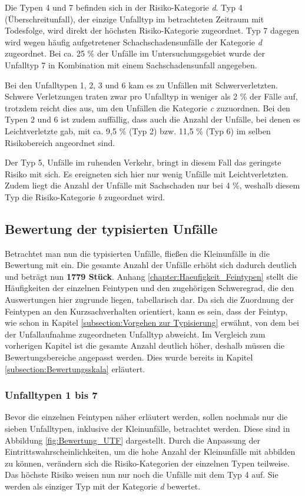 Die Typen 4 und 7 befinden sich in der Risiko-Kategorie \textit{d}. Typ 4 (Überschreitunfall), der einzige Unfalltyp im betrachteten Zeitraum mit Todesfolge, wird direkt der höchsten Risiko-Kategorie zugeordnet. Typ 7 dagegen wird wegen häufig aufgetretener Schachschadensunfälle der Kategorie \textit{d} zugeordnet. Bei ca. 25 \% der Unfälle im Untersuchungsgebiet wurde der Unfalltyp 7 in Kombination mit einem Sachschadensunfall angegeben.

Bei den Unfalltypen 1, 2, 3 und 6 kam es zu Unfällen mit Schwerverletzten. Schwere Verletzungen traten zwar pro Unfalltyp in weniger als 2 \% der Fälle auf, trotzdem reicht dies aus, um den Unfällen die Kategorie \textit{c} zuzuordnen. Bei den Typen 2 und 6 ist zudem auffällig, dass auch die Anzahl der Unfälle, bei denen es Leichtverletzte gab, mit ca. 9,5 \% (Typ 2) bzw. 11,5 \% (Typ 6) im selben Risikobereich angeordnet sind.

Der Typ 5, Unfälle im ruhenden Verkehr, bringt in diesem Fall das geringste Risiko mit sich. Es ereigneten sich hier nur wenig Unfälle mit Leichtverletzten. Zudem liegt die Anzahl der Unfälle mit Sachschaden nur bei 4 \%, weshalb diesem Typ die Risiko-Kategorie \textit{b} zugeordnet wird.

\subsection{Bewertung der typisierten Unfälle}\label{subsection:Bewertung der typisierten Unfälle}
Betrachtet man nun die typisierten Unfälle, fließen die Kleinunfälle in die Bewertung mit ein. Die gesamte Anzahl der Unfälle erhöht sich dadurch deutlich und beträgt nun \textbf{1779 Stück}. Anhang \ref{chapter:Haeufigkeit_Feintypen} stellt die Häufigkeiten der einzelnen Feintypen und den zugehörigen Schweregrad, die den Auswertungen hier zugrunde liegen, tabellarisch dar. Da sich die Zuordnung der Feintypen an den Kurzsachverhalten orientiert, kann es sein, dass der Feintyp, wie schon in Kapitel \ref{subsection:Vorgehen zur Typisierung} erwähnt, von dem bei der Unfallaufnahme zugeordneten Unfalltyp abweicht. Im Vergleich zum vorherigen Kapitel ist die gesamte Anzahl deutlich höher, deshalb müssen die Bewertungsbereiche angepasst werden. Dies wurde bereits in Kapitel \ref{subsection:Bewertungsskala} erläutert.

\subsubsection{Unfalltypen 1 bis 7}
Bevor die einzelnen Feintypen näher erläutert werden, sollen nochmals nur die sieben Unfalltypen, inklusive der Kleinunfälle, betrachtet werden. Diese sind in Abbildung \ref{fig:Bewertung_UTF} dargestellt. Durch die Anpassung der Eintrittswahrscheinlichkeiten, um die hohe Anzahl der Kleinunfälle mit abbilden zu können, verändern sich die Risiko-Kategorien der einzelnen Typen teilweise. Das höchste Risiko weisen nun nur noch die Unfälle mit dem Typ 4 auf. Sie werden als einziger Typ mit der Kategorie \textit{d} bewertet.

